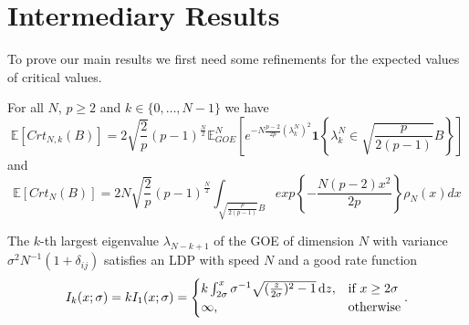 \section{Intermediary Results}
To prove our main results we first need some refinements for the expected values of critical values.

\begin{theorem}
	For all $N$, $p\geq 2$ and $k\in\{0,\dots,N-1\}$ we have
	\begin{equation}\label{thm:2.1}
		\mathbb E[Crt_{N,k}(B)]=2\sqrt{\frac{2}{p}}(p-1)^{\frac{N}{2}}\mathbb E_{GOE}^N\left[e^{-N\frac{p-2}{2p}(\lambda_k^N)^2}\bm 1\left\{\lambda_k^N\in\sqrt{\frac{p}{2(p-1)}}B \right\}\right]
	\end{equation} and
	\begin{equation}\label{thm:2.2}
		\mathbb E[Crt_N(B)]=2N\sqrt{\frac{2}{p}}(p-1)^{\frac{N}{2}}\int_{\sqrt{\frac{p}{2(p-1)}}B}exp\left\{-\frac{N(p-2)x^2}{2p}\right\}\rho_N(x)dx
	\end{equation}
\end{theorem}

\begin{theorem}
	The $k$-th largest eigenvalue $\lambda_{N-k+1}$ of the GOE of dimension $N$ with variance $\sigma^2 N^{-1}(1+\delta_{ij})$  satisfies an LDP with speed $N$ and a good rate function 
	\begin{equation}\label{thm:A.1}
		I_k(x;\sigma)=k I_1(x;\sigma)=\begin{cases}
						k\int_{2\sigma}^x \sigma^{-1}\sqrt{(\frac{z}{2\sigma})^2-1}\mathop{}\!\mathrm{d} z, &\mbox{if } x\geq 2\sigma \\
						\infty, &\mbox{otherwise}
					  \end{cases}.
	\end{equation}
\end{theorem}








